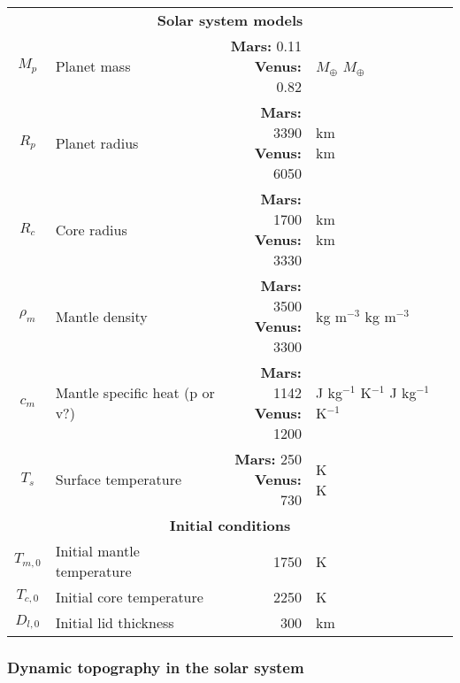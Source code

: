 \begin{table}
\begin{tabular}{@{} c l r l p{4cm} @{}}
\midrule
\multicolumn{5}{c}{\textbf{Solar system models}} \\
$M_p$ & Planet mass &  \makecell[tr]{\textbf{Mars:} 0.11 \\ \textbf{Venus:} 0.82} & \makecell[tl]{$M_\oplus$ \\ $M_\oplus$ } &  \\
$R_p$ & Planet radius &  \makecell[tr]{\textbf{Mars:} 3390 \\ \textbf{Venus:} 6050} & \makecell[tl]{km \\ km } &  \\
$R_c$ & Core radius &  \makecell[tr]{\textbf{Mars:} 1700 \\ \textbf{Venus:} 3330} & \makecell[tl]{km \\ km } &  \makecell[tl]{\citet{Thiriet2019} \\ \citet{Huang2013}} \\
$\rho_m$ & Mantle density & \makecell[tr]{\textbf{Mars:} 3500 \\ \textbf{Venus:} 3300} & \makecell[tl]{kg m$^{-3}$ \\ kg m$^{-3}$} &   \makecell[tl]{\citet{Thiriet2019} \\ \citet{Nimmo1996}} \\
$c_m$ & Mantle specific heat (p or v?) & \makecell[tr]{\textbf{Mars:} 1142 \\ \textbf{Venus:} 1200} & \makecell[tl]{J kg$^{-1}$ K$^{-1}$ \\ J kg$^{-1}$ K$^{-1}$}  & \makecell[tl]{\citet{Thiriet2019} \\  \citet{Nimmo1996}}  \\
$T_s$ & Surface temperature & \makecell[tr]{\textbf{Mars:} 250 \\ \textbf{Venus:} 730} & \makecell[tl]{K \\ K} \\

\midrule
\multicolumn{5}{c}{\textbf{Initial conditions}} \\
$T_{m,0}$ & Initial mantle temperature & 1750 & K & \citet{Thiriet2019}\\
$T_{c,0}$ & Initial core temperature & 2250 & K & \citet{Thiriet2019} \\
$D_{l,0}$ & Initial lid thickness & 300 & km & \citet{Thiriet2019}\\
\bottomrule
\end{tabular}
\end{table}



\subsubsection{Dynamic topography in the solar system}\label{sec:dyn_top_ss}

